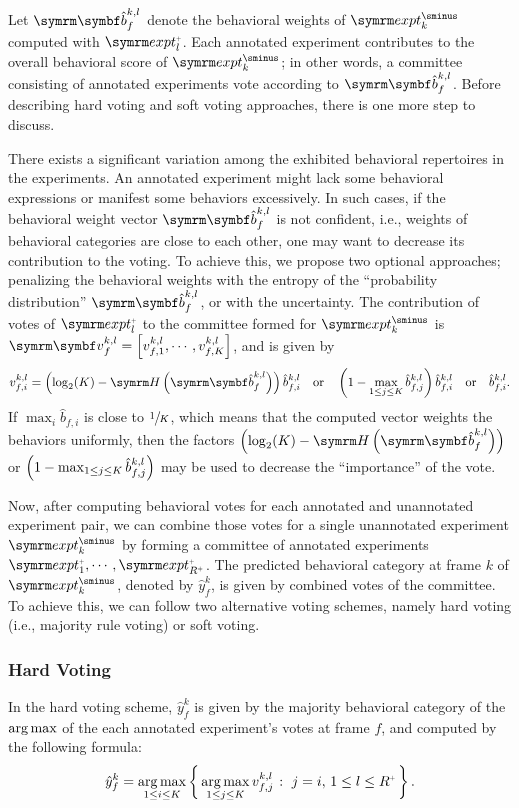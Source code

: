 Let $\V{\hat{b}}_f^{k,l}$ denote the behavioral weights of $\exptUnann_k$ computed with $\exptAnn_l$. Each annotated experiment contributes to the overall behavioral score of $\exptUnann_k$; in other words, a committee consisting of annotated experiments vote according to $\V{\hat{b}}_f^{k,l}$. Before describing hard voting and soft voting approaches, there is one more step to discuss.

There exists a significant variation among the exhibited behavioral repertoires in the experiments.
An annotated experiment might lack some behavioral expressions or manifest some behaviors excessively.
In such cases, if the behavioral weight vector $\V{\hat{b}}_f^{k,l}$ is not confident, i.e., weights of behavioral categories are close to each other, one may want to decrease its contribution to the voting.
To achieve this, we propose two optional approaches; penalizing the behavioral weights with the entropy of the ``probability distribution'' $\V{\hat{b}}_f^{k,l}$, or with the uncertainty.
The contribution of votes of $\exptAnn_l$ to the committee formed for $\exptUnann_k$ is $\V{v}_f^{k,l} = \qmatrix{v_{f,1}^{k,l}, \cdots, v_{f,K}^{k,l}}$, and is given by
\begin{equation}
	v_{f,i}^{k,l} = \rbr{\log_2(K) - \entropy{\V{\hat{b}}_f^{k,l}}} \hat{b}_{f,i}^{k,l} \qbor \rbr{ 1 - \max_{1 \leq j \leq K} \hat{b}_{f,j}^{k,l}} \hat{b}_{f,i}^{k,l} \qbor \hat{b}_{f,i}^{k,l}.
\end{equation}
If $\max_i \hat{b}_{f,i}$ is close to $\sfrac{1}{K}$, which means that the computed vector weights the behaviors uniformly, then the factors $\rbr{\log_2(K) - \entropy{\V{\hat{b}}_f^{k,l}}}$ or $\left( 1 - \max_{1 \leq j \leq K} \hat{b}_{f,j}^{k,l}\right)$ may be used to decrease the ``importance'' of the vote.

Now, after computing behavioral votes for each annotated and unannotated experiment pair, we can combine those votes for a single unannotated experiment $\exptUnann_k$  by forming a committee of annotated experiments $\exptAnn_1, \cdots, \exptAnn_{\Ann{R}}$.
The predicted behavioral category at frame $k$ of $\exptUnann_k$, denoted by $\hat{y}^k_f$, is given by combined votes of the committee.
To achieve this, we can follow two alternative voting schemes, namely hard voting (i.e., majority rule voting) or soft voting.


\subsubsection{Hard Voting}
In the hard voting scheme, $\hat{y}^k_f$ is given by the majority behavioral category of the $\operatorname*{arg\,max}$ of the each annotated experiment's votes at frame $f$, and computed by the following formula:
\begin{equation}
	\hat{y}^k_f = \argmax_{1 \leq i \leq K} \Set{\argmax_{1 \leq j \leq K} v_{f,j}^{k,l}}{j=i, \, 1 \leq l \leq \Ann{R}}.
\end{equation}


